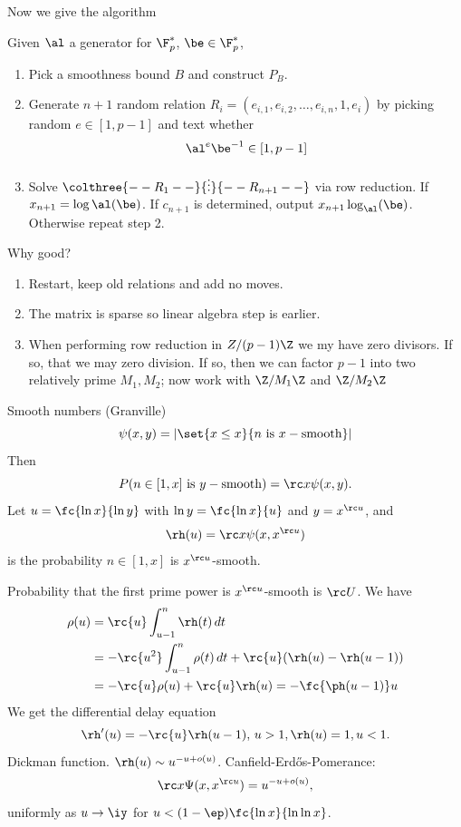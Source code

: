 Now we give the algorithm
\begin{alg}
Given $\al$ a generator for $\F_p^*$, $\be\in \F_p^*$,
\begin{enumerate}
\item
Pick a smoothness bound $B$ and construct $P_B$.
\item
Generate $n+1$ random relation $R_i=(e_{i,1},e_{i,2},\ldots, e_{i,n},1,e_i)$ by picking random $e\in[1,p-1]$ and text whether 
\[
\al^e\be^{-1}\in [1,p-1]
\]
\item
Solve $\colthree{--R_1--}{\vdots}{--R_{n+1}--}$ via row reduction. If $x_{n+1}=\log{\al}(\be)$.
If $c_{n+1}$ is determined, output $x_{n+1}\log_{\al}(\be)$. Otherwise repeat step 2.
\end{enumerate}
Why good?
\begin{enumerate}
\item
Restart, keep old relations and add no moves.%
\item
The matrix is sparse so linear algebra step is earlier.
\item
When performing row reduction in $Z/(p-1)\Z$ we my have zero divisors. If so, that we may zero division. If so, then we can factor $p-1$ into two relatively prime $M_1,M_2$; now work with $\Z/M_1\Z$ and $\Z/M_2\Z$
\end{enumerate}
\end{alg}

Smooth numbers (Granville) 
\[
\psi(x,y)=|\set{x\le x}{n\text{ is }x-\text{smooth}}|
\]
Then
\[
P(n\in [1,x]\text{ is }y-\text{smooth})=\rc x\psi(x,y).
\]
Let $u=\fc{\ln x}{\ln y}$ with $\ln y=\fc{\ln x}{u}$ and $y=x^{\rc u}$, and
\[
\rh(u)=\rc x\psi(x,x^{\rc u})
\]
is the probability $n\in [1,x]$ is $x^{\rc u}$-smooth.

Probability that the first prime power is $x^{\rc u}$-smooth is $\rc U$. We have
\begin{align*}
\rho(u)&=\rc{u}\int_{u-1}^n \rh(t)\,dt \\
&=-\rc{u^2} \int_{u-1}^n \rho(t)\,dt+\rc{u}(\rh(u)-\rh(u-1))\\
&=-\rc{u} \rho(u)+\rc{u}\rh(u) =-\fc{\ph(u-1)}u
\end{align*}
 We get the differential delay equation
\[
\rh'(u)=-\rc{u}\rh(u-1),\, u>1,\rh(u)=1,u<1.
\]
Dickman function. $\rh(u)\sim u^{-u+o(u)}$. Canfield-Erd\H os-Pomerance:
\[
\rc x\Psi(x,x^{\rc u})=u^{-u+o(u)},
\]
uniformly as $u\to \iy$ for $u<(1-\ep)\fc{\ln x}{\ln\ln x}$.

